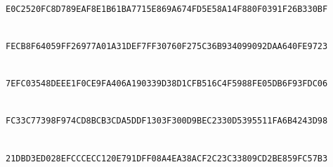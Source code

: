 \noindent{}\\
{\footnotesize\texttt{E0C2520FC8D789EAF8E1B61BA7715E869A674FD5E58A14F880F0391F26B330BF}}\par\smallskip

\noindent{}\\
{\footnotesize\texttt{FECB8F64059FF26977A01A31DEF7FF30760F275C36B934099092DAA640FE9723}}\par\smallskip

\noindent{}\\
{\footnotesize\texttt{7EFC03548DEEE1F0CE9FA406A190339D38D1CFB516C4F5988FE05DB6F93FDC06}}\par\smallskip

\noindent{}\\
{\footnotesize\texttt{FC33C77398F974CD8BCB3CDA5DDF1303F300D9BEC2330D5395511FA6B4243D98}}\par\smallskip

\noindent{}\\
{\footnotesize\texttt{21DBD3ED028EFCCCECC120E791DFF08A4EA38ACF2C23C33809CD2BE859FC57B3}}\par\smallskip
